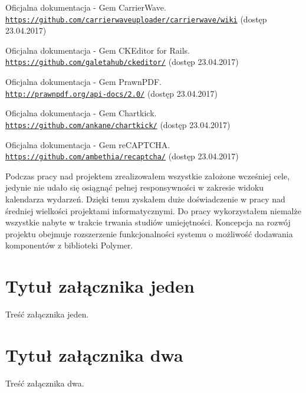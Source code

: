 \documentclass[openright]{xmgr}
\begin{document}
\begin{thebibliography}{9}
Oficjalna dokumentacja - Gem CarrierWave.
\\\texttt{\url{https://github.com/carrierwaveuploader/carrierwave/wiki}} (dostęp 23.04.2017)

Oficjalna dokumentacja - Gem CKEditor for Rails.
\\\texttt{\url{https://github.com/galetahub/ckeditor/}} (dostęp 23.04.2017)

Oficjalna dokumentacja - Gem PrawnPDF.
\\\texttt{\url{http://prawnpdf.org/api-docs/2.0/}} (dostęp 23.04.2017)

Oficjalna dokumentacja - Gem Chartkick.
\\\texttt{\url{https://github.com/ankane/chartkick/}} (dostęp 23.04.2017)

Oficjalna dokumentacja - Gem reCAPTCHA.
\\\texttt{\url{https://github.com/ambethia/recaptcha/}} (dostęp 23.04.2017)

\end{thebibliography} 


\summary
Podczas pracy nad projektem zrealizowałem wszystkie założone wcześniej cele, jedynie nie udało się osiągnąć pełnej responsywności w zakresie widoku kalendarza wydarzeń. Dzięki temu zyskałem duże doświadczenie w pracy nad średniej wielkości projektami informatycznymi. Do pracy wykorzystałem niemalże wszystkie nabyte w trakcie trwania studiów umiejętności. Koncepcja na rozwój projektu obejmuje rozszerzenie funkcjonalności systemu o możliwość dodawania komponentów z biblioteki Polymer. 

\appendix
\chapter{Tytuł załącznika jeden}

Treść załącznika jeden.

\chapter{Tytuł załącznika dwa}

Treść załącznika dwa.

\listoffigures

\lstlistoflistings
{}%

\oswiadczenie
\end{document}
